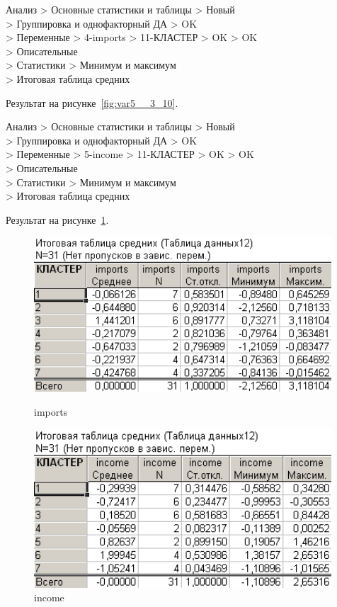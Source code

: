 Анализ > Основные статистики и таблицы > Новый\\
> Группировка и однофакторный ДА > OK\\
> Переменные > 4-imports > 11-КЛАСТЕР > OK > OK\\
> Описательные\\
> Статистики > Минимум и максимум\\
> Итоговая таблица средних

Результат на рисунке~\ref{fig:var5__3_10}.

Анализ > Основные статистики и таблицы > Новый\\
> Группировка и однофакторный ДА > OK\\
> Переменные > 5-income > 11-КЛАСТЕР > OK > OK\\
> Описательные\\
> Статистики > Минимум и максимум\\
> Итоговая таблица средних

Результат на рисунке~\ref{fig:var5__3_11}.

\begin{figure}[!h]
  \centering
  \begin{minipage}{0.49\textwidth}
    \centering

    \includegraphics[width=0.99\textwidth]
    {inc/cars_my/var5__3_10.PNG}

    \caption{imports}
    \label{fig:var5__3_10}
  \end{minipage}
  \begin{minipage}{0.49\textwidth}
    \centering

    \includegraphics[width=0.99\textwidth]
    {inc/cars_my/var5__3_11.PNG}

    \caption{income}
    \label{fig:var5__3_11}
  \end{minipage}
\end{figure}

